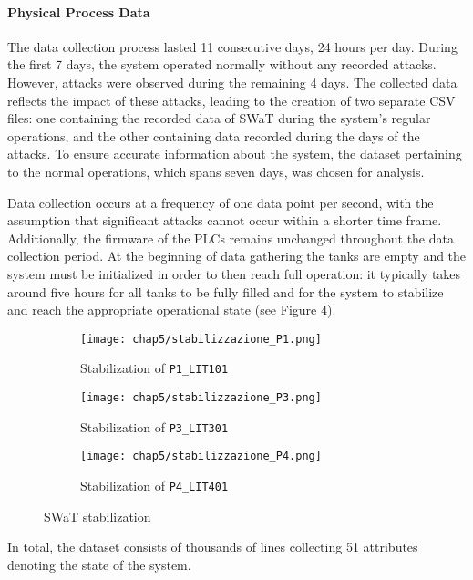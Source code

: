 \paragraph{Physical Process Data}
\label{par:5_2015_physical_dataset}
The data collection process lasted 11 consecutive days, 24 hours per day. During the first 7 days, the system operated normally without any recorded attacks. However, attacks were observed during the remaining 4 days. The collected data reflects the impact of these attacks, leading to the creation of two separate CSV files: one containing the recorded data of SWaT during the system's regular operations, and the other containing data recorded during the days of the attacks. To ensure accurate information about the system, the dataset pertaining to the normal operations, which spans seven days, was chosen for analysis.

\bigskip
Data collection occurs at a frequency of one data point per second, with the assumption that significant attacks cannot occur within a shorter time frame. Additionally, the firmware of the PLCs remains unchanged throughout the data collection period.\newline
At the beginning of data gathering the tanks are empty and the system must be initialized in order to then reach full operation: it typically takes around five hours for all tanks to be fully filled and for the system to stabilize and reach the appropriate operational state (see Figure \ref{fig:5_swat_stabilization}).

\begin{figure}[ht]
	\centering
	\begin{subfigure}{0.48\textwidth}
		\texttt{[image: chap5/stabilizzazione\_P1.png]}
		\caption{Stabilization of \texttt{P1\_LIT101}}
		\label{subfig:5_stab_lit101}
	\end{subfigure}
	\hfill
	\begin{subfigure}{0.48\textwidth}
		\texttt{[image: chap5/stabilizzazione\_P3.png]}
		\caption{Stabilization of \texttt{P3\_LIT301}}
		\label{subfig:5_stab_lit301}
	\end{subfigure}
	\begin{subfigure}{0.48\textwidth}
		\texttt{[image: chap5/stabilizzazione\_P4.png]}
		\caption{Stabilization of \texttt{P4\_LIT401}}
		\label{subfig:5_stab_lit401}
	\end{subfigure}
	\caption{SWaT stabilization}
	\label{fig:5_swat_stabilization}
\end{figure}
In total, the dataset consists of thousands of lines collecting 51 attributes denoting the state of the system.

